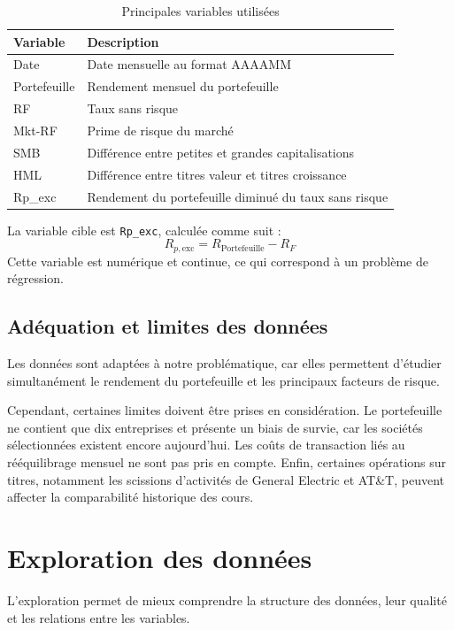 \documentclass[12pt,a4paper]{article}
\begin{document}
\begin{table}[H]
\centering
\begin{tabular}{@{}lp{9.5cm}@{}}
\toprule
\textbf{Variable} & \textbf{Description} \\
\midrule
Date & Date mensuelle au format AAAAMM \\
Portefeuille & Rendement mensuel du portefeuille \\
RF & Taux sans risque \\
Mkt-RF & Prime de risque du marché \\
SMB & Différence entre petites et grandes capitalisations \\
HML & Différence entre titres valeur et titres croissance \\
Rp\_exc & Rendement du portefeuille diminué du taux sans risque \\
\bottomrule
\end{tabular}
\caption{Principales variables utilisées}
\end{table}

La variable cible est \texttt{Rp\_exc}, calculée comme suit :
\[
R_{p,\mathrm{exc}} = R_{\mathrm{Portefeuille}} - R_F
\]
Cette variable est numérique et continue, ce qui correspond à un problème de régression.

\subsection{Adéquation et limites des données}

Les données sont adaptées à notre problématique, car elles permettent d'étudier simultanément le rendement du portefeuille et les principaux facteurs de risque.

Cependant, certaines limites doivent être prises en considération. Le portefeuille ne contient que dix entreprises et présente un biais de survie, car les sociétés sélectionnées existent encore aujourd'hui. Les coûts de transaction liés au rééquilibrage mensuel ne sont pas pris en compte. Enfin, certaines opérations sur titres, notamment les scissions d'activités de General Electric et AT\&T, peuvent affecter la comparabilité historique des cours.

\section{Exploration des données}

L'exploration permet de mieux comprendre la structure des données, leur qualité et les relations entre les variables.
\end{document}
